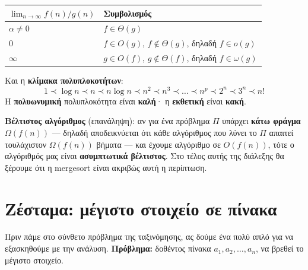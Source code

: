 \documentclass[11pt,a4paper]{article}
\begin{document}
\begin{center}
\begin{tabular}{@{}l l@{}}
\toprule
$\lim_{n \to \infty} f(n)/g(n)$ & Συμβολισμός \\
\midrule
$\alpha \ne 0$ & $f \in \Theta(g)$ \\
$0$            & $f \in O(g)$, $f \notin \Theta(g)$, δηλαδή $f \in o(g)$ \\
$\infty$       & $g \in O(f)$, $g \notin \Theta(f)$, δηλαδή $f \in \omega(g)$ \\
\bottomrule
\end{tabular}
\end{center}

Και η \textbf{κλίμακα πολυπλοκοτήτων}:
\[
1 \prec \log n \prec n \prec n \log n \prec n^2 \prec n^3 \prec \dots \prec n^p
\prec 2^n \prec 3^n \prec n!
\]
Η \textbf{πολυωνυμική} πολυπλοκότητα είναι \textbf{καλή}· η \textbf{εκθετική}
είναι \textbf{κακή}.

\begin{keypoint}
\textbf{Βέλτιστος αλγόριθμος} (επανάληψη): αν για ένα πρόβλημα $\Pi$ υπάρχει
\textbf{κάτω φράγμα} $\Omega(f(n))$ --- δηλαδή αποδεικνύεται ότι κάθε αλγόριθμος
που λύνει το $\Pi$ απαιτεί τουλάχιστον $\Omega(f(n))$ βήματα --- και έχουμε
αλγόριθμο σε $O(f(n))$, τότε ο αλγόριθμός μας είναι \textbf{ασυμπτωτικά
βέλτιστος}. Στο τέλος αυτής της διάλεξης θα ξέρουμε ότι η mergesort είναι ακριβώς
αυτή η περίπτωση.
\end{keypoint}

\section{Ζέσταμα: μέγιστο στοιχείο σε πίνακα}

Πριν πάμε στο σύνθετο πρόβλημα της ταξινόμησης, ας δούμε ένα πολύ απλό για να
εξασκηθούμε με την ανάλυση. \textbf{Πρόβλημα:} δοθέντος πίνακα
$a_1, a_2, \dots, a_n$, να βρεθεί το μέγιστο στοιχείο.
\end{document}
